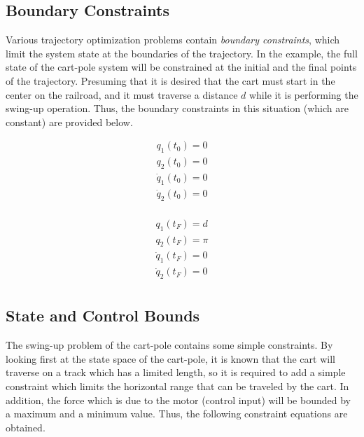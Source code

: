 \documentclass{thesisreport}
\begin{document}
\subsection{Boundary Constraints}

Various trajectory optimization problems contain \textit{boundary constraints}, which limit  the system state at the boundaries of the trajectory. In the example, the full state of the cart-pole system will be constrained at the initial and the final points of the trajectory. Presuming that it is desired that the cart must start in the center on the railroad, and it must traverse a distance $d$ while it is performing the swing-up operation. Thus, the boundary constraints in this situation (which are constant) are provided below.

\begin{multicols}{2}
 
\begin{equation*}
\begin{aligned}
q_1(t_0) = 0 \\
q_2(t_0) = 0 \\
\dot{q}_1(t_0) = 0 \\
\dot{q}_2(t_0) = 0 \\
\end{aligned}
\end{equation*}

\columnbreak

\begin{equation*}
\begin{aligned}
q_1(t_F) = d \\
q_2(t_F) = \pi \\
\dot{q}_1(t_F) = 0 \\
\dot{q}_2(t_F) = 0 \\
\end{aligned}
\end{equation*}

\end{multicols}


\subsection{State and Control Bounds}

The swing-up problem of the cart-pole contains some simple constraints. By looking first at the state space of the cart-pole, it is known that the cart will traverse on a track which has a limited length, so it is required to add a simple constraint which limits the horizontal range that can be traveled by the cart. In addition, the force which is due to the motor (control input) will be bounded by a maximum and a minimum value.
Thus, the following constraint equations are obtained.
\end{document}
